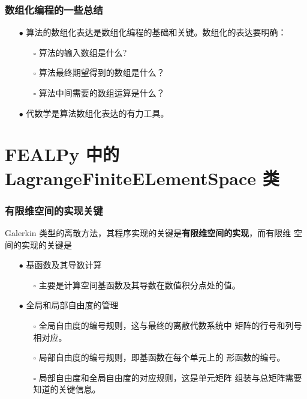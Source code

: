 \documentclass{beamer}
\numberwithin{subsection}{section}
\begin{document}
\begin{frame}
    \frametitle{数组化编程的一些总结}
    \begin{itemize}
        \item[$\bullet$] 算法的数组化表达是数组化编程的基础和关键。数组化的表达要明确：
            \begin{itemize}
                \item[$\square$] 算法的输入数组是什么?
                \item[$\square$] 算法最终期望得到的数组是什么？
                \item[$\square$] 算法中间需要的数组运算是什么？
            \end{itemize}
        \item[$\bullet$] 代数学是算法数组化表达的有力工具。
    \end{itemize}
\end{frame}

\section{FEALPy 中的 LagrangeFiniteELementSpace 类}

\begin{frame}
    \frametitle{有限维空间的实现关键}
    Galerkin 类型的离散方法，其程序实现的关键是{\bf 有限维空间的实现}，而有限维
    空间的实现的关键是
    \begin{itemize}
        \item[$\bullet$] 基函数及其导数计算
            \begin{itemize}
                \item[$\square$] 主要是计算空间基函数及其导数在数值积分点处的值。
            \end{itemize}
        \item[$\bullet$] 全局和局部自由度的管理
            \begin{itemize}
                \item[$\square$] 全局自由度的编号规则，这与最终的离散代数系统中
                    矩阵的行号和列号相对应。 
                \item[$\square$] 局部自由度的编号规则，即基函数在每个单元上的
                    形函数的编号。 
                \item[$\square$] 局部自由度和全局自由度的对应规则，这是单元矩阵
                    组装与总矩阵需要知道的关键信息。 
            \end{itemize}
    \end{itemize}
\end{frame}
\end{document}
